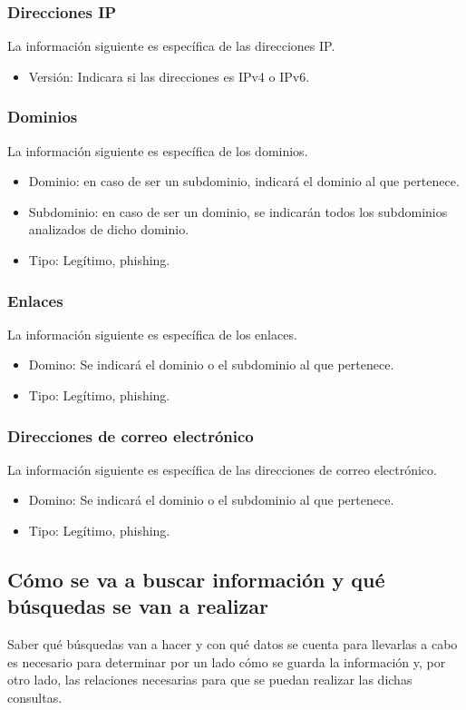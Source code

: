 \subsubsection{Direcciones IP}
La información siguiente es específica de las direcciones IP.
\begin{itemize}
    \item Versión: Indicara si las direcciones es IPv4 o IPv6.
\end{itemize}

\subsubsection{Dominios}
La información siguiente es específica de los dominios.
\begin{itemize}
    \item Dominio: en caso de ser un subdominio, indicará el dominio al que pertenece. 
    \item Subdominio: en caso de ser un dominio, se    indicarán todos los subdominios analizados de dicho dominio.
    \item Tipo: Legítimo, phishing. 
\end{itemize}

\subsubsection{Enlaces}
La información siguiente es específica de los enlaces.
\begin{itemize}
    \item Domino: Se indicará el dominio o el subdominio al que pertenece.
    \item Tipo: Legítimo, phishing. 
\end{itemize}

\subsubsection{Direcciones de correo electrónico}
La información siguiente es específica de las direcciones de correo electrónico.
\begin{itemize}
    \item Domino: Se indicará el dominio o el subdominio al que pertenece.
    \item Tipo: Legítimo, phishing. 
\end{itemize}


\subsection{Cómo se va a buscar información y qué búsquedas se van a realizar}
Saber qué búsquedas van a hacer y con qué datos se cuenta para llevarlas a cabo es necesario para determinar por un lado cómo se guarda la información y, por otro lado, las relaciones necesarias para que se puedan realizar las dichas consultas.

